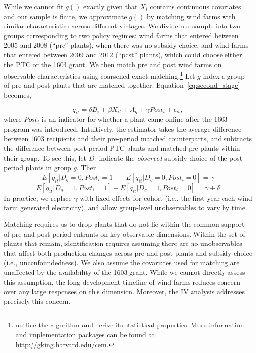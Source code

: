 \documentclass[12pt]{article}
\begin{document}
While we cannot fit $g()$ exactly given that $X_{i}$ contains continuous covariates and our sample is finite, we approximate $g()$ by matching wind farms with similar characteristics across different vintages. We divide our sample into two groups corresponding to two policy regimes: wind farms that entered between 2005 and 2008 (``pre'' plants), when there was no subsidy choice, and wind farms that entered between 2009 and 2012 (``post'' plants), which could choose either the PTC or the 1603 grant. We then match pre and post wind farms on observable characteristics using coarsened exact matching.\footnote{\citet{iacus_causal_2012} outline the algorithm and derive its statistical properties. More information and implementation packages can be found at \href{http://gking.harvard.edu/cem}{http://gking.harvard.edu/cem}.} Let $g$ index a group of pre and post plants that are matched together. Equation~\ref{eq:second_stage} becomes, 

\begin{equation}
q_{it}=\delta D_{i}+\beta X_{it}+A_{g}+\gamma Post_{i}+\epsilon_{it}\label{eq:mdd} ,
\end{equation}
where $Post_{i}$ is an indicator for whether a plant came online after the 1603 program was introduced. Intuitively, the estimator takes the average difference between 1603 recipients and their pre-period matched counterparts, and subtracts the difference between post-period PTC plants and matched pre-plants within their group. To see this, let $D_{g}$ indicate the \emph{observed} subsidy choice of the post-period plants in group $g$. Then
\[
E[q_{it}|D_{g}=0,Post_{i}=1]-E[q_{it}|D_{g}=0,Post_{i}=0]=\gamma
\]
\[
E[q_{it}|D_{g}=1,Post_{i}=1]-E[q_{it}|D_{g}=1,Post_{i}=0]=\gamma+\delta
\]
In practice, we replace $\gamma$ with fixed effects for cohort (i.e., the first year each wind farm generated electricity), and allow group-level unobservables to vary by time.

Matching requires us to drop plants that do not lie within the common support of pre and post period entrants on key observable dimensions. Within the set of plants that remain, identification requires assuming there are no unobservables that affect both production changes across pre and post plants and subsidy choice (i.e., unconfoundedness). We also assume the covariates used for matching are unaffected by the availability of the 1603 grant. While we cannot directly assess this assumption, the long development timeline of wind farms reduces concern over any large responses on this dimension. Moreover, the IV analysis addresses precisely this concern.
\end{document}
